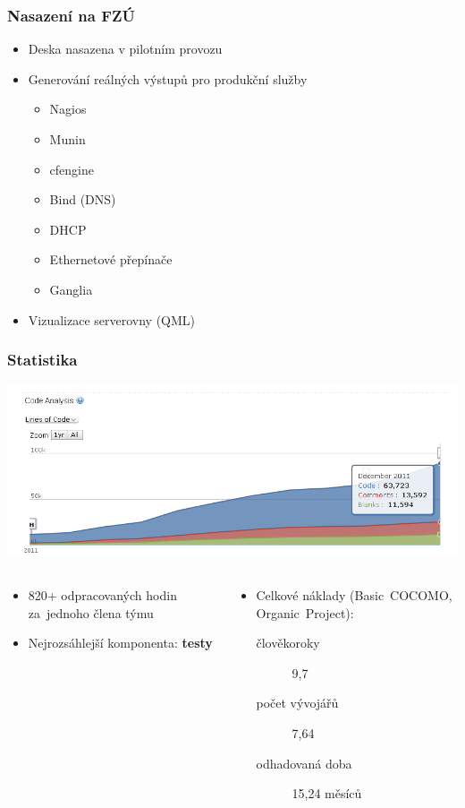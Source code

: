 \documentclass{beamer}
\begin{document}
\begin{frame}[fragile]
\frametitle{Nasazení na FZÚ}
\begin{itemize}
    \item Deska nasazena v pilotním provozu
        \item Generování reálných výstupů pro produkční služby
        \begin{itemize}
            \item Nagios
            \item Munin
            \item cfengine
            \item Bind (DNS)
            \item DHCP
            \item Ethernetové přepínače
            \item Ganglia
        \end{itemize}
    \item Vizualizace serverovny (QML)
\end{itemize}
\end{frame}

\begin{frame}[fragile]
\frametitle{Statistika}

\includegraphics[width=\textwidth]{deska-ohloh-loc-2011.png}

\begin{columns}[t]
\begin{column}{.45\textwidth}
\begin{itemize}
    \item 820+ odpracovaných hodin za~jednoho člena týmu
    \item Nejrozsáhlejší komponenta: {\bf testy}
\end{itemize}
\end{column}
\begin{column}{.6\textwidth}
\begin{itemize}
    \item Celkové náklady (Basic~COCOMO, Organic~Project):
        \begin{description}
            \item[člověkoroky] 9,7
            \item[počet vývojářů] 7,64
            \item[odhadovaná doba] 15,24 měsíců
        \end{description}
\end{itemize}
\end{column}
\end{columns}
\end{frame}
\end{document}
